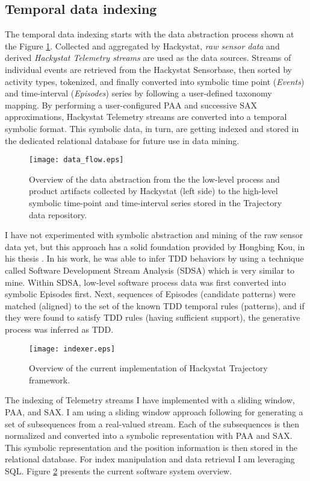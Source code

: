 \subsection{Temporal data indexing} \label{indexing}
The temporal data indexing starts with the data abstraction process shown at the Figure \ref{fig:data_flow}. Collected and aggregated by Hackystat, \textit{raw sensor data} and derived \textit{Hackystat Telemetry streams} are used as the data sources. Streams of individual events are retrieved from the Hackystat Sensorbase, then sorted by activity types, tokenized, and finally converted into symbolic time point (\textit{Events}) and time-interval (\textit{Episodes}) series by following a user-defined taxonomy mapping. By performing a user-configured PAA and successive SAX approximations, Hackystat Telemetry streams are converted into a temporal symbolic format. This symbolic data, in turn, are getting indexed and stored in the dedicated relational database for future use in data mining.

\begin{figure}[tbp]
   \centering
   \texttt{[image: data\_flow.eps]}
   \caption{Overview of the data abstraction from the the low-level process and product artifacts collected by Hackystat (left side) to the high-level symbolic time-point and time-interval series stored in the Trajectory data repository.}
   \label{fig:data_flow}
\end{figure}

I have not experimented with symbolic abstraction and mining of the raw sensor data yet, but this approach has a solid foundation provided by Hongbing Kou, in his thesis \cite{citeulike:2703162}. In his work, he was able to infer TDD behaviors by using a technique called Software Development Stream Analysis (SDSA) which is very similar to mine. Within SDSA, low-level software process data was first converted into symbolic Episodes first. Next, sequences of Episodes (candidate patterns) were matched (aligned) to the set of the known TDD temporal rules (patterns), and if they were found to satisfy TDD rules (having sufficient support), the generative process was inferred as TDD.

\begin{figure}[tbp]
   \centering
   \texttt{[image: indexer.eps]}
   \caption{Overview of the current implementation of Hackystat Trajectory framework.}
   \label{fig:indexer}
\end{figure}

The indexing of Telemetry streams I have implemented with a sliding window, PAA, and SAX. I am using a sliding window approach following \cite{citeulike:2821475} for generating a set of subsequences from a real-valued stream. Each of the subsequences is then normalized and converted into a symbolic representation with PAA and SAX. This symbolic representation and the position information is then stored in the relational database. For index manipulation and data retrieval I am leveraging SQL. Figure \ref{fig:indexer} presents the current software system overview.

